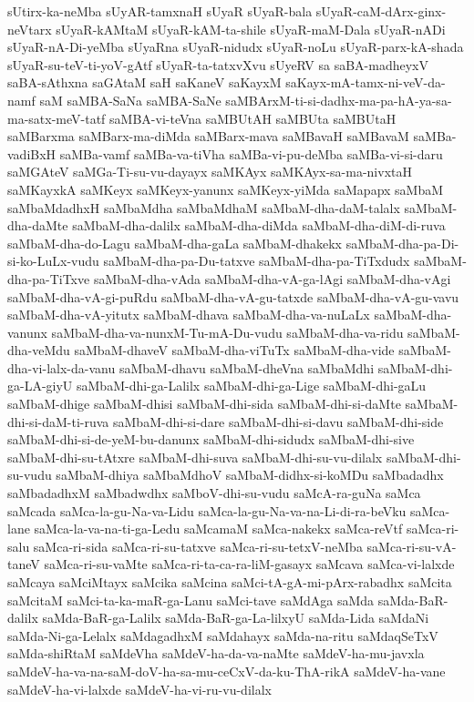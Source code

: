 {sUtirx-ka-neMba
sUyAR-tamxnaH
sUyaR
sUyaR-bala
sUyaR-caM-dArx-ginx-neVtarx
sUyaR-kAMtaM
sUyaR-kAM-ta-shile
sUyaR-maM-Dala
sUyaR-nADi
sUyaR-nA-Di-yeMba
sUyaRna
sUyaR-nidudx
sUyaR-noLu
sUyaR-parx-kA-shada
sUyaR-su-teV-ti-yoV-gAtf
sUyaR-ta-tatxvXvu
sUyeRV
sa
saBA-madheyxV
saBA-sAthxna
saGAtaM
saH
saKaneV
saKayxM
saKayx-mA-tamx-ni-veV-da-namf
saM
saMBA-SaNa
saMBA-SaNe
saMBArxM-ti-si-dadhx-ma-pa-hA-ya-sa-ma-satx-meV-tatf
saMBA-vi-teVna
saMBUtAH
saMBUta
saMBUtaH
saMBarxma
saMBarx-ma-diMda
saMBarx-mava
saMBavaH
saMBavaM
saMBa-vadiBxH
saMBa-vamf
saMBa-va-tiVha
saMBa-vi-pu-deMba
saMBa-vi-si-daru
saMGAteV
saMGa-Ti-su-vu-dayayx
saMKAyx
saMKAyx-sa-ma-nivxtaH
saMKayxkA
saMKeyx
saMKeyx-yanunx
saMKeyx-yiMda
saMapapx
saMbaM
saMbaMdadhxH
saMbaMdha
saMbaMdhaM
saMbaM-dha-daM-talalx
saMbaM-dha-daMte
saMbaM-dha-dalilx
saMbaM-dha-diMda
saMbaM-dha-diM-di-ruva
saMbaM-dha-do-Lagu
saMbaM-dha-gaLa
saMbaM-dhakekx
saMbaM-dha-pa-Di-si-ko-LuLx-vudu
saMbaM-dha-pa-Du-tatxve
saMbaM-dha-pa-TiTxdudx
saMbaM-dha-pa-TiTxve
saMbaM-dha-vAda
saMbaM-dha-vA-ga-lAgi
saMbaM-dha-vAgi
saMbaM-dha-vA-gi-puRdu
saMbaM-dha-vA-gu-tatxde
saMbaM-dha-vA-gu-vavu
saMbaM-dha-vA-yitutx
saMbaM-dhava
saMbaM-dha-va-nuLaLx
saMbaM-dha-vanunx
saMbaM-dha-va-nunxM-Tu-mA-Du-vudu
saMbaM-dha-va-ridu
saMbaM-dha-veMdu
saMbaM-dhaveV
saMbaM-dha-viTuTx
saMbaM-dha-vide
saMbaM-dha-vi-lalx-da-vanu
saMbaM-dhavu
saMbaM-dheVna
saMbaMdhi
saMbaM-dhi-ga-LA-giyU
saMbaM-dhi-ga-Lalilx
saMbaM-dhi-ga-Lige
saMbaM-dhi-gaLu
saMbaM-dhige
saMbaM-dhisi
saMbaM-dhi-sida
saMbaM-dhi-si-daMte
saMbaM-dhi-si-daM-ti-ruva
saMbaM-dhi-si-dare
saMbaM-dhi-si-davu
saMbaM-dhi-side
saMbaM-dhi-si-de-yeM-bu-danunx
saMbaM-dhi-sidudx
saMbaM-dhi-sive
saMbaM-dhi-su-tAtxre
saMbaM-dhi-suva
saMbaM-dhi-su-vu-dilalx
saMbaM-dhi-su-vudu
saMbaM-dhiya
saMbaMdhoV
saMbaM-didhx-si-koMDu
saMbadadhx
saMbadadhxM
saMbadwdhx
saMboV-dhi-su-vudu
saMcA-ra-guNa
saMca
saMcada
saMca-la-gu-Na-va-Lidu
saMca-la-gu-Na-va-na-Li-di-ra-beVku
saMca-lane
saMca-la-va-na-ti-ga-Ledu
saMcamaM
saMca-nakekx
saMca-reVtf
saMca-ri-salu
saMca-ri-sida
saMca-ri-su-tatxve
saMca-ri-su-tetxV-neMba
saMca-ri-su-vA-taneV
saMca-ri-su-vaMte
saMca-ri-ta-ca-ra-liM-gasayx
saMcava
saMca-vi-lalxde
saMcaya
saMciMtayx
saMcika
saMcina
saMci-tA-gA-mi-pArx-rabadhx
saMcita
saMcitaM
saMci-ta-ka-maR-ga-Lanu
saMci-tave
saMdAga
saMda
saMda-BaR-dalilx
saMda-BaR-ga-Lalilx
saMda-BaR-ga-La-lilxyU
saMda-Lida
saMdaNi
saMda-Ni-ga-Lelalx
saMdagadhxM
saMdahayx
saMda-na-ritu
saMdaqSeTxV
saMda-shiRtaM
saMdeVha
saMdeV-ha-da-va-naMte
saMdeV-ha-mu-javxla
saMdeV-ha-va-na-saM-doV-ha-sa-mu-ceCxV-da-ku-ThA-rikA
saMdeV-ha-vane
saMdeV-ha-vi-lalxde
saMdeV-ha-vi-ru-vu-dilalx
}
